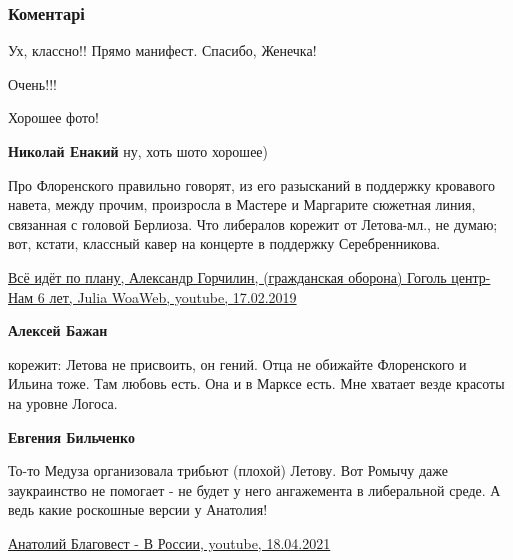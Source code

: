  
 
 
 
 
\subsubsection{Коментарі}

\begin{itemize} %
Ух, классно!! Прямо манифест. Спасибо, Женечка!

Очень!!!

Хорошее фото!

\begin{itemize} %
\textbf{Николай Енакий} ну, хоть шото хорошее)
\end{itemize} %


Про Флоренского правильно говорят, из его разысканий в поддержку кровавого
навета, между прочим, произросла в Мастере и Маргарите сюжетная линия,
связанная с головой Берлиоза. Что либералов корежит от Летова-мл., не думаю;
вот, кстати, классный кавер на концерте в поддержку Серебренникова.

\href{https://www.youtube.com/watch?v=IV6LmZQdfaw}{%
Всё идёт по плану, Александр Горчилин, (гражданская оборона) Гоголь центр-Нам 6 лет, %
Julia WoaWeb, youtube, 17.02.2019%
}

\begin{itemize} %
\textbf{Алексей Бажан} 

корежит: Летова не присвоить, он гений. Отца не обижайте Флоренского и Ильина
тоже. Там любовь есть. Она и в Марксе есть. Мне хватает везде красоты на уровне
Логоса.

\textbf{Евгения Бильченко} 

То-то Медуза организовала трибьют (плохой) Летову. Вот Ромычу даже заукраинство
не помогает - не будет у него ангажемента в либеральной среде. А ведь какие
роскошные версии у Анатолия! 

\href{https://www.youtube.com/watch?v=cfJXP8IIJA0}{%
Анатолий Благовест - В России, youtube, 18.04.2021%
}


\end{itemize}
\end{itemize}
